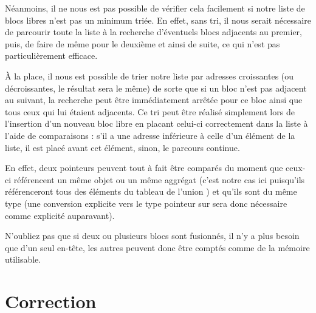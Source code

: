 Néanmoins, il ne nous est pas possible de vérifier cela facilement si
notre liste de blocs libres n'est pas un minimum triée. En effet, sans
tri, il nous serait nécessaire de parcourir toute la liste à la
recherche d'éventuels blocs adjacents au premier, puis, de faire de même
pour le deuxième et ainsi de suite, ce qui n'est pas particulièrement
efficace.

À la place, il nous est possible de trier notre liste par adresses
croissantes (ou décroissantes, le résultat sera le même) de sorte que si
un bloc n'est pas adjacent au suivant, la recherche peut être
immédiatement arrêtée pour ce bloc ainsi que tous ceux qui lui étaient
adjacents. Ce tri peut être réalisé simplement lors de l'insertion d'un
nouveau bloc libre en placant celui-ci correctement dans la liste à
l'aide de comparaisons : s'il a une adresse inférieure à celle d'un
élément de la liste, il est placé avant cet élément, sinon, le parcours
continue.

En effet, deux pointeurs peuvent tout à fait être comparés du moment que
ceux-ci référencent un même objet ou un même aggrégat (c'est notre cas
ici puisqu'ils référenceront tous des éléments du tableau 
de l'union ) et qu'ils sont du même type (une conversion
explicite vers le type pointeur sur  sera donc nécessaire
comme explicité auparavant).

\begin{infobox}
  N'oubliez pas que si deux ou
plusieurs blocs sont fusionnés, il n'y a plus besoin que d'un seul
en-tête, les autres peuvent donc être comptés comme de la mémoire
utilisable.
\end{infobox}

\section{Correction}
\label{correction-23}

